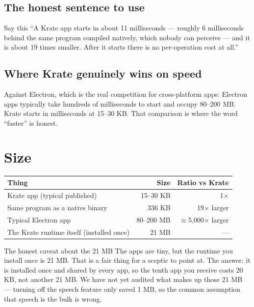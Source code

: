 \documentclass[11pt,a4paper]{report}
\begin{document}
\subsection{The honest sentence to use}

\begin{plainbox}{Say this}
``A Krate app starts in about 11 milliseconds --- roughly 6 milliseconds
behind the same program compiled natively, which nobody can perceive --- and
it is about 19 times smaller. After it starts there is no per-operation
cost at all.''
\end{plainbox}

\subsection{Where Krate genuinely wins on speed}

Against Electron, which is the real competition for cross-platform apps:
Electron apps typically take hundreds of milliseconds to start and occupy
80--200 MB. Krate starts in milliseconds at 15--30 KB. That comparison is
where the word ``faster'' is honest.

\section{Size}

\begin{center}
\begin{tabular}{lrr}
\toprule
\textbf{Thing} & \textbf{Size} & \textbf{Ratio vs Krate} \\
\midrule
Krate app (typical published) & 15--30 KB & 1$\times$ \\
Same program as a native binary & 336 KB & 19$\times$ larger \\
Typical Electron app & 80--200 MB & $\approx$5{,}000$\times$ larger \\
\midrule
The Krate runtime itself (installed once) & 21 MB & --- \\
\bottomrule
\end{tabular}
\end{center}

\begin{warnbox}{The honest caveat about the 21 MB}
The apps are tiny, but the runtime you install once is 21 MB. That is a
fair thing for a sceptic to point at. The answer: it is installed once and
shared by every app, so the tenth app you receive costs 20 KB, not another
21 MB. We have not yet audited what makes up those 21 MB --- turning off
the speech feature only saved 1 MB, so the common assumption that speech
is the bulk is wrong.
\end{warnbox}
\end{document}
